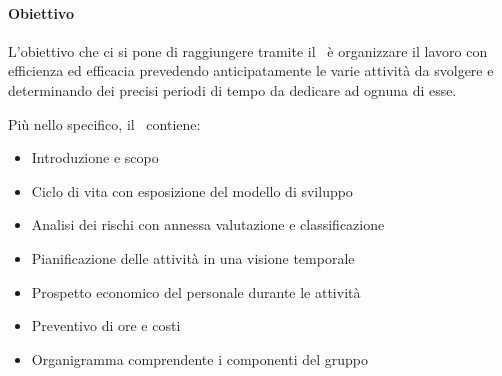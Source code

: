 			\paragraph{Obiettivo}
			L'obiettivo che ci si pone di raggiungere tramite il \PdP\ è organizzare il lavoro con efficienza ed efficacia prevedendo anticipatamente le varie attività da svolgere e determinando dei precisi periodi di tempo da dedicare ad ognuna di esse. \par
			Più nello specifico, il \PdPv\ contiene:
			\begin{itemize}
				\item Introduzione e scopo
				\item Ciclo di vita con esposizione del modello di sviluppo
				\item Analisi dei rischi con annessa valutazione e classificazione
				\item Pianificazione delle attività in una visione temporale
				\item Prospetto economico del personale durante le attività 
				\item Preventivo di ore e costi 
				\item Organigramma comprendente i componenti del gruppo
			\end{itemize}

